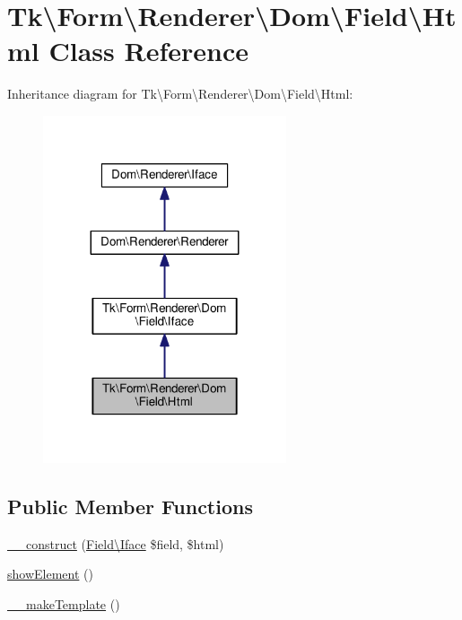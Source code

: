 \hypertarget{classTk_1_1Form_1_1Renderer_1_1Dom_1_1Field_1_1Html}{\section{Tk\textbackslash{}Form\textbackslash{}Renderer\textbackslash{}Dom\textbackslash{}Field\textbackslash{}Html Class Reference}
\label{classTk_1_1Form_1_1Renderer_1_1Dom_1_1Field_1_1Html}
}


Inheritance diagram for Tk\textbackslash{}Form\textbackslash{}Renderer\textbackslash{}Dom\textbackslash{}Field\textbackslash{}Html\+:\nopagebreak
\begin{figure}[H]
\begin{center}
\leavevmode
\includegraphics[width=203pt]{classTk_1_1Form_1_1Renderer_1_1Dom_1_1Field_1_1Html__inherit__graph}
\end{center}
\end{figure}
\subsection*{Public Member Functions}
\begin{DoxyCompactItemize}
\item 
\hyperlink{classTk_1_1Form_1_1Renderer_1_1Dom_1_1Field_1_1Html_a428ec264e10aad234e500ee237ea9581}{\+\_\+\+\_\+construct} (\hyperlink{classTk_1_1Form_1_1Renderer_1_1Dom_1_1Field_1_1Iface}{Field\textbackslash{}\+Iface} \$field, \$html)
\item 
\hyperlink{classTk_1_1Form_1_1Renderer_1_1Dom_1_1Field_1_1Html_abd1e07e5a157a478b8f9a3656115c5c0}{show\+Element} ()
\item 
\hyperlink{classTk_1_1Form_1_1Renderer_1_1Dom_1_1Field_1_1Html_a450ce2d85ec3feaeaa721cb27c31952c}{\+\_\+\+\_\+make\+Template} ()
\end{DoxyCompactItemize}
